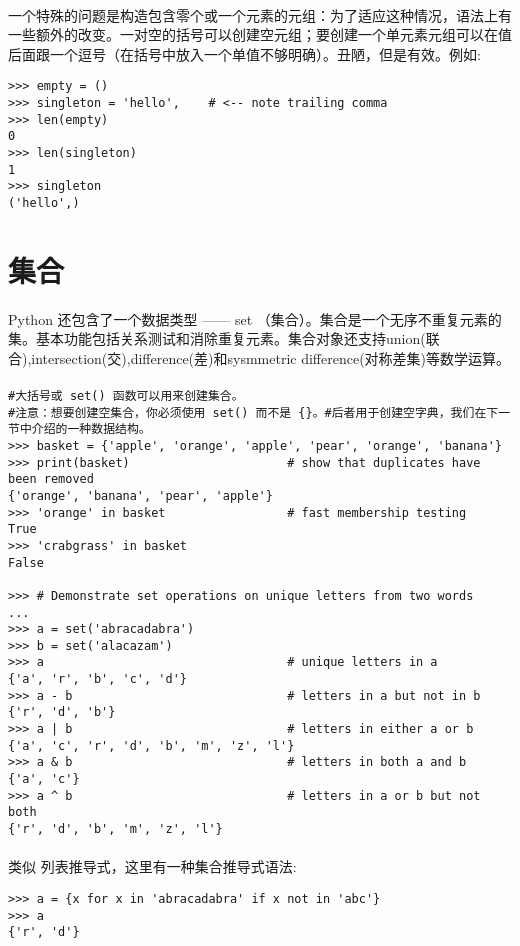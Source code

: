 \documentclass{article}
\begin{document}
\begin{CJK}{UTF8}{gbsn}
\paragraph{}
一个特殊的问题是构造包含零个或一个元素的元组：为了适应这种情况，语法上有一些额外的改变。一对空的括号可以创建空元组；要创建一个单元素元组可以在值后面跟一个逗号（在括号中放入一个单值不够明确）。丑陋，但是有效。例如:
\begin{verbatim}
>>> empty = ()
>>> singleton = 'hello',    # <-- note trailing comma
>>> len(empty)
0
>>> len(singleton)
1
>>> singleton
('hello',)
\end{verbatim}
\section{集合}
\paragraph{}
Python 还包含了一个数据类型 —— set （集合）。集合是一个无序不重复元素的集。基本功能包括关系测试和消除重复元素。集合对象还支持union(联合),intersection(交),difference(差)和sysmmetric difference(对称差集)等数学运算。
\paragraph{}
\begin{verbatim}
#大括号或 set() 函数可以用来创建集合。
#注意：想要创建空集合，你必须使用 set() 而不是 {}。#后者用于创建空字典，我们在下一节中介绍的一种数据结构。
>>> basket = {'apple', 'orange', 'apple', 'pear', 'orange', 'banana'}
>>> print(basket)                      # show that duplicates have been removed
{'orange', 'banana', 'pear', 'apple'}
>>> 'orange' in basket                 # fast membership testing
True
>>> 'crabgrass' in basket
False

>>> # Demonstrate set operations on unique letters from two words
...
>>> a = set('abracadabra')
>>> b = set('alacazam')
>>> a                                  # unique letters in a
{'a', 'r', 'b', 'c', 'd'}
>>> a - b                              # letters in a but not in b
{'r', 'd', 'b'}
>>> a | b                              # letters in either a or b
{'a', 'c', 'r', 'd', 'b', 'm', 'z', 'l'}
>>> a & b                              # letters in both a and b
{'a', 'c'}
>>> a ^ b                              # letters in a or b but not both
{'r', 'd', 'b', 'm', 'z', 'l'}
\end{verbatim}
\paragraph{}
类似 列表推导式，这里有一种集合推导式语法:
\begin{verbatim}
>>> a = {x for x in 'abracadabra' if x not in 'abc'}
>>> a
{'r', 'd'}
\end{verbatim}

\end{CJK}
\end{document}
